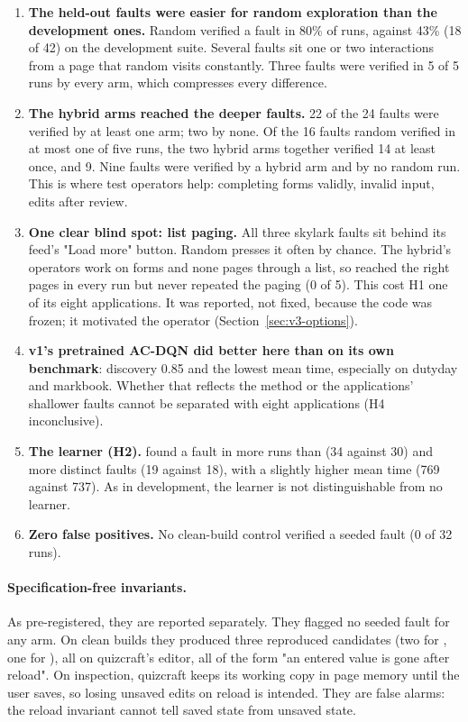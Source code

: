 \begin{enumerate}
  \item \textbf{The held-out faults were easier for random exploration than the development
        ones.} Random verified a fault in 80\% of runs, against 43\% (18 of 42) on the
        development suite. Several faults sit one or two interactions from a page that
        random visits constantly. Three faults were verified in 5 of 5 runs by every arm,
        which compresses every difference.
  \item \textbf{The hybrid arms reached the deeper faults.} 22 of the 24 faults were
        verified by at least one arm; two by none. Of the 16 faults random verified in at
        most one of five runs, the two hybrid arms together verified 14 at least once, and
         9. Nine faults were verified by a hybrid arm and by no
        random run. This is where test operators help: completing forms validly, invalid
        input, edits after review.
  \item \textbf{One clear blind spot: list paging.} All three skylark faults sit behind its
        feed's "Load more" button. Random presses it often by chance. The hybrid's operators
        work on forms and none pages through a list, so  reached the
        right pages in every run but never repeated the paging (0 of 5). This cost H1 one
        of its eight applications. It was reported, not fixed, because the code was frozen;
        it motivated the  operator (Section~\ref{sec:v3-options}).
  \item \textbf{v1's pretrained AC-DQN did better here than on its own benchmark}: discovery
        0.85 and the lowest mean time, especially on dutyday and markbook. Whether that
        reflects the method or the applications' shallower faults cannot be separated with
        eight applications (H4 inconclusive).
  \item \textbf{The learner (H2).}  found a fault in more runs than
         (34 against 30) and more distinct faults (19 against 18), with
        a slightly higher mean time (769 against 737). As in development, the learner is
        not distinguishable from no learner.
  \item \textbf{Zero false positives.} No clean-build control verified a seeded fault
        (0 of 32 runs).
\end{enumerate}

\paragraph{Specification-free invariants.} As pre-registered, they are reported separately.
They flagged no seeded fault for any arm. On clean builds they produced three reproduced
candidates (two for , one for ), all on
quizcraft's editor, all of the form "an entered value is gone after reload". On inspection,
quizcraft keeps its working copy in page memory until the user saves, so losing unsaved
edits on reload is intended. They are false alarms: the reload invariant cannot tell saved
state from unsaved state.

